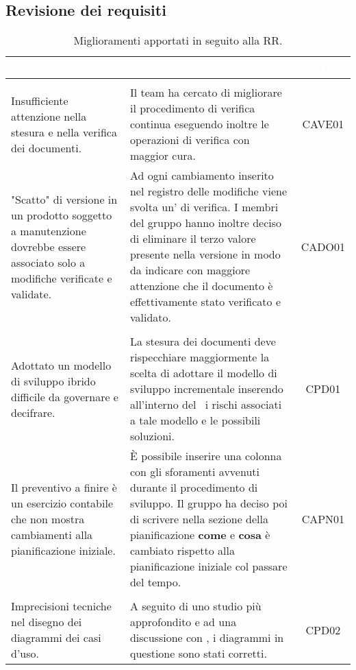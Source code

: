\subsection{Revisione dei requisiti}
	\begin{longtable}{|C{4cm}|C{9cm}|c|}
		\caption{\label{tab:Criticità}Miglioramenti apportati in seguito alla RR.}\\
		\textcolor{white}{\textbf{Osservazione}}&
		\textcolor{white}{\textbf{Soluzione adottata}}&
		\textcolor{white}{\textbf{ID}}\\ \hline
		\\ \hline
		Insufficiente attenzione nella stesura e nella verifica dei documenti. & Il team ha cercato di migliorare il procedimento di verifica continua eseguendo inoltre le operazioni di verifica con maggior cura. & CAVE01\\ \hline %
		"Scatto" di versione in un prodotto soggetto a manutenzione dovrebbe essere associato solo a modifiche verificate e validate. & Ad ogni cambiamento inserito nel registro delle modifiche viene svolta un' di verifica. I membri del gruppo hanno inoltre deciso di eliminare il terzo valore presente nella versione in modo da indicare con maggiore attenzione che il documento è effettivamente stato verificato e validato. & CADO01\\ \hline %
		\\ \hline
		Adottato un modello di sviluppo ibrido difficile da governare e decifrare. & La stesura dei documenti deve rispecchiare maggiormente la scelta di adottare il modello di sviluppo incrementale inserendo all'interno del \PdP\ i rischi associati a tale modello e le possibili soluzioni. & CPD01\\ \hline %
		Il preventivo a finire è un esercizio contabile che non mostra cambiamenti alla pianificazione iniziale. & È possibile inserire una colonna con gli sforamenti avvenuti durante il procedimento di sviluppo. Il gruppo ha deciso poi di scrivere nella sezione della pianificazione \textbf{come} e \textbf{cosa} è cambiato rispetto alla pianificazione iniziale col passare del tempo. & CAPN01\\ \hline %
		\\ \hline
		Imprecisioni tecniche nel disegno dei diagrammi dei casi d’uso. & A seguito di uno studio più approfondito e ad una discussione con \CR{}, i diagrammi in questione sono stati corretti. & CPD02\\ \hline %

\end{longtable}
